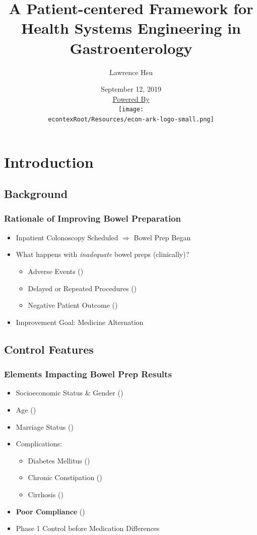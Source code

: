 \documentclass[pdflatex]{beamer}
\title[Bowel Prep Improvements]{A Patient-centered Framework for Health Systems Engineering in Gastroenterology}
\author[Hsu]{Lawrence Hsu}
\institute[JHU]{Johns Hopkins University}
\date[\today]{September 12, 2019  \\ \medskip \medskip \medskip \href{https://econ-ark.org/}{\small Powered By} \\ \texttt{[image: \\econtexRoot/Resources/econ-ark-logo-small.png]}}
\begin{document}
\begin{frame}[plain]
  \titlepage
\end{frame}


\section{Introduction}
\subsection{Background}

\begin{frame}
\frametitle{Rationale of Improving Bowel Preparation}

\begin{itemize}
\item Inpatient Colonoscopy Scheduled $\Rightarrow$ Bowel Prep Began
\item What happens with {\it inadequate} bowel preps (clinically)? 
\begin{itemize}
\item Adverse Events (\cite{Almadi2018-lx})
\item Delayed or Repeated Procedures (\cite{Ness2001-ff})
\item Negative Patient Outcome (\cite{Garber2019-rw})
\end{itemize}
\medskip
\item Improvement Goal: Medicine Alternation
\end{itemize}

\end{frame}

\subsection{Control Features}
\begin{frame}
\frametitle{Elements Impacting Bowel Prep Results}

\begin{itemize}
\item Socioeconomic Status \& Gender (\cite{Yadlapati2018-kg})
\item Age (\cite{Chung2009-kt})
\item Marriage Status (\cite{Lebwohl2010-ti})
\item Complications:
\begin{itemize}
  \item Diabetes Mellitus (\cite{Reilly2004-tz})
  \item Chronic Constipation (\cite{Hautefeuille2014-yy})
  \item Cirrhosis (\cite{Ness2001-ff})
\end{itemize}
\item {\bf Poor Compliance} (\cite{Almadi2018-lx})
\end{itemize}

\medskip
\begin{itemize}
  \item Phase 1 Control before Medication Differences
\end{itemize}
\end{frame}
\end{document}

